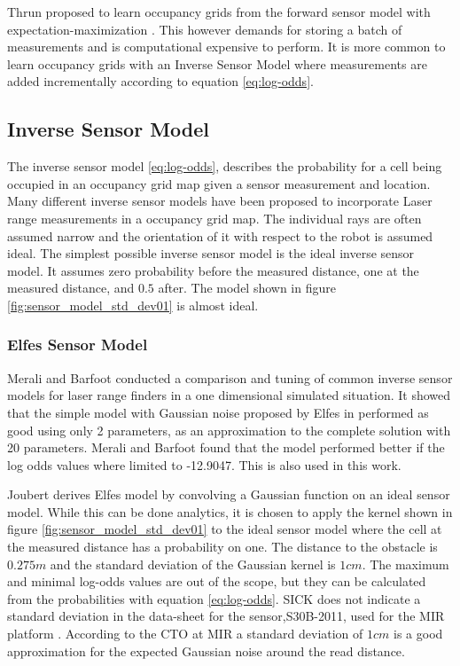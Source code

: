 Thrun proposed to learn occupancy grids from the forward sensor model with expectation-maximization \cite{probRob}.
This however demands for storing a batch of measurements and is computational expensive to perform. 
It is more common to learn occupancy grids with an Inverse Sensor Model where measurements are added incrementally according to equation \ref{eq:log-odds}. 

\subsection{Inverse Sensor Model}
The inverse sensor model \ref{eq:log-odds}, describes the probability for a cell being occupied in an occupancy grid map given a sensor measurement and location.
Many different inverse sensor models have been proposed to incorporate Laser range measurements in a occupancy grid map. The individual rays are often assumed narrow and the orientation of it with respect to the robot is assumed ideal.
The simplest possible inverse sensor model is the 
ideal inverse sensor model. It assumes zero probability before the measured distance, one at the measured distance, and $0.5$ after. The model shown in figure \ref{fig:sensor_model_std_dev01} is almost ideal.

\subsubsection{Elfes Sensor Model}
Merali and Barfoot \cite{sensorModelTuning} conducted a comparison and tuning of common inverse sensor models for laser range finders in a one dimensional simulated situation. It showed that the simple model with Gaussian noise proposed by Elfes in \cite{elfes} performed as good using only 2 parameters, as an approximation to the complete solution with 20 parameters. Merali and Barfoot found that the model performed better if the log odds values where limited to -12.9047. This is also used in this work.

Joubert \cite{monteCarloIntegration} derives Elfes model by convolving a Gaussian function on an ideal sensor model. While this can be done analytics, it is chosen to apply the kernel shown in figure \ref{fig:sensor_model_std_dev01} to the ideal sensor model where the cell at the measured distance has a probability on one.
The distance to the obstacle is $0.275m$ and the standard deviation of the Gaussian kernel is $1cm$. 
The maximum and minimal log-odds values are out of the scope, but they can be calculated from the probabilities with equation \ref{eq:log-odds}.
SICK does not indicate a standard deviation in the data-sheet for the sensor,S30B-2011, used for the MIR platform \cite{lidarDatasheet}.
According to the CTO at MIR a standard deviation of $1cm$ is a good approximation for the expected Gaussian noise around the read distance. 

